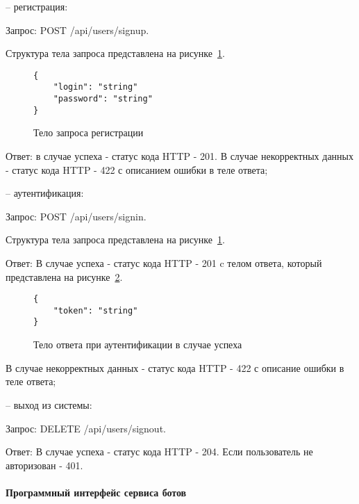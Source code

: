 -- \hspace{\clabelsep} регистрация:

Запрос: POST /api/users/signup.

Структура тела запроса представлена на рисунке~\ref{f:signup-request-body}.

\begin{figure}[ht]
	\centering
	\vspace{\toppaddingoffigure}
	\begin{lstlisting}
{
    "login": "string"
    "password": "string"
}
    \end{lstlisting}
	\caption{Тело запроса регистрации}
	\label{f:signup-request-body}
\end{figure}

Ответ: в случае успеха - статус кода HTTP - 201. В случае некорректных
данных - статус кода HTTP - 422 с описанием ошибки в теле ответа;


-- \hspace{\clabelsep} аутентификация:

Запрос: POST /api/users/signin.

Структура тела запроса представлена на рисунке~\ref{f:signup-request-body}.

Ответ: В случае успеха - статус кода HTTP - 201 c телом ответа, который
представлена на рисунке~\ref{f:signin-response-body}.

\begin{figure}[ht]
	\centering
	\vspace{\toppaddingoffigure}
	\begin{lstlisting}
{
    "token": "string"
}
    \end{lstlisting}
	\caption{Тело ответа при аутентификации в случае успеха}
	\label{f:signin-response-body}
\end{figure}

В случае некорректных данных - статус кода HTTP - 422 с описание
ошибки в теле ответа;

-- \hspace{\clabelsep} выход из системы:

Запрос: DELETE /api/users/signout.

Ответ: В случае успеха - статус кода HTTP - 204. Если пользователь не
авторизован - 401.

\paragraph{Программный интерфейс сервиса ботов}

